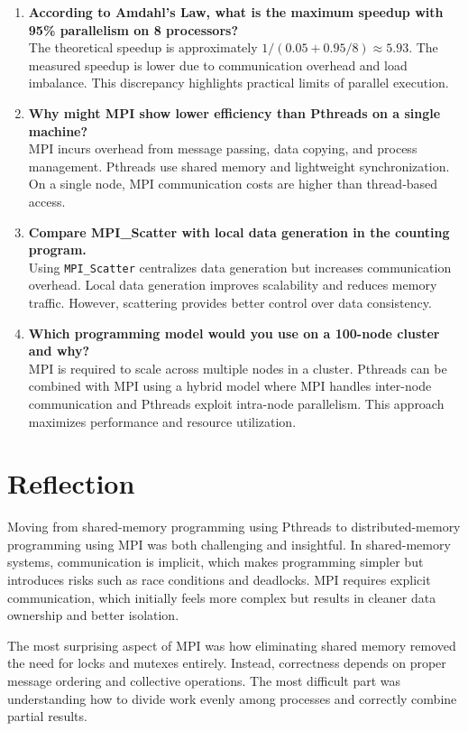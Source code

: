 \documentclass[12pt,a4paper]{article}
\begin{document}
\begin{enumerate}
\item \textbf{According to Amdahl’s Law, what is the maximum speedup with 95\% parallelism on 8 processors?} \\
The theoretical speedup is approximately $1 / (0.05 + 0.95/8) \approx 5.93$.
The measured speedup is lower due to communication overhead and load imbalance.
This discrepancy highlights practical limits of parallel execution.

\item \textbf{Why might MPI show lower efficiency than Pthreads on a single machine?} \\
MPI incurs overhead from message passing, data copying, and process management.
Pthreads use shared memory and lightweight synchronization.
On a single node, MPI communication costs are higher than thread-based access.

\item \textbf{Compare MPI\_Scatter with local data generation in the counting program.} \\
Using \texttt{MPI\_Scatter} centralizes data generation but increases
communication overhead.
Local data generation improves scalability and reduces memory traffic.
However, scattering provides better control over data consistency.

\item \textbf{Which programming model would you use on a 100-node cluster and why?} \\
MPI is required to scale across multiple nodes in a cluster.
Pthreads can be combined with MPI using a hybrid model where MPI handles
inter-node communication and Pthreads exploit intra-node parallelism.
This approach maximizes performance and resource utilization.

\end{enumerate}

\section{Reflection}

Moving from shared-memory programming using Pthreads to distributed-memory
programming using MPI was both challenging and insightful.
In shared-memory systems, communication is implicit, which makes programming
simpler but introduces risks such as race conditions and deadlocks.
MPI requires explicit communication, which initially feels more complex but
results in cleaner data ownership and better isolation.

The most surprising aspect of MPI was how eliminating shared memory removed
the need for locks and mutexes entirely.
Instead, correctness depends on proper message ordering and collective
operations.
The most difficult part was understanding how to divide work evenly among
processes and correctly combine partial results.
\end{document}
